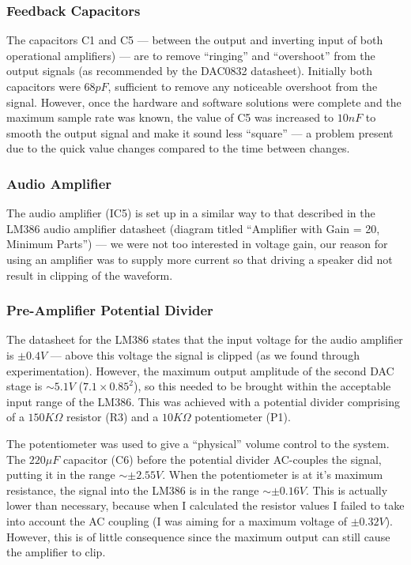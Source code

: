 \subsubsection{Feedback Capacitors}

The capacitors C1 and C5 --- between the output and inverting input of both operational amplifiers) 
--- are to remove ``ringing'' and ``overshoot'' from the output signals (as recommended by the 
DAC0832 datasheet\cite{dac0832}).  Initially both capacitors were $68pF$, sufficient to remove any 
noticeable overshoot from the signal.  However, once the hardware and software solutions were 
complete and the maximum sample rate was known, the value of C5 was increased to $10nF$ to smooth 
the output signal and make it sound less ``square'' --- a problem present due to the quick value 
changes compared to the time between changes.

\subsubsection{Audio Amplifier}

The audio amplifier (IC5) is set up in a similar way to that described in the LM386 audio amplifier 
datasheet\cite{lm386} (diagram titled ``Amplifier with Gain = 20, Minimum Parts'') --- we were not 
too interested in voltage gain, our reason for using an amplifier was to supply more current so that 
driving a speaker did not result in clipping of the waveform.

\subsubsection{Pre-Amplifier Potential Divider}

The datasheet for the LM386\cite{lm386} states that the input voltage for the audio amplifier is 
$\pm0.4V$ --- above this voltage the signal is clipped (as we found through experimentation).  
However, the maximum output amplitude of the second DAC stage is $\sim5.1V$ ($7.1\times0.85^2$), so 
this needed to be brought within the acceptable input range of the LM386.  This was achieved with a 
potential divider comprising of a $150K\Omega$ resistor (R3) and a $10K\Omega$ potentiometer (P1).  

The potentiometer was used to give a ``physical'' volume control to the system.  The $220\mu{}F$ 
capacitor (C6) before the potential divider AC-couples the signal, putting it in the range 
$\sim\pm2.55V$.  When the potentiometer is at it's maximum resistance, the signal into the LM386 is 
in the range $\sim\pm0.16V$.  This is actually lower than necessary, because when I calculated the 
resistor values I failed to take into account the AC coupling (I was aiming for a maximum voltage of 
$\pm0.32V$).  However, this is of little consequence since the maximum output can still cause the 
amplifier to clip.


